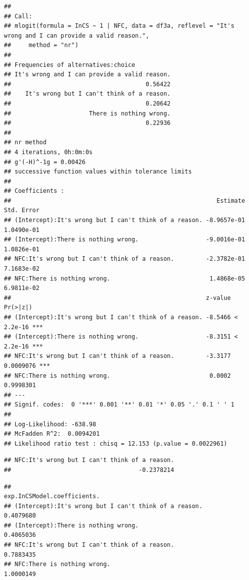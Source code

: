 \documentclass[
  american,
  man,floatsintext]{apa7}
\begin{document}
\begin{verbatim}
## 
## Call:
## mlogit(formula = InCS ~ 1 | NFC, data = df3a, reflevel = "It's wrong and I can provide a valid reason.", 
##     method = "nr")
## 
## Frequencies of alternatives:choice
## It's wrong and I can provide a valid reason. 
##                                      0.56422 
##    It's wrong but I can't think of a reason. 
##                                      0.20642 
##                      There is nothing wrong. 
##                                      0.22936 
## 
## nr method
## 4 iterations, 0h:0m:0s 
## g'(-H)^-1g = 0.00426 
## successive function values within tolerance limits 
## 
## Coefficients :
##                                                          Estimate  Std. Error
## (Intercept):It's wrong but I can't think of a reason. -8.9657e-01  1.0490e-01
## (Intercept):There is nothing wrong.                   -9.0016e-01  1.0826e-01
## NFC:It's wrong but I can't think of a reason.         -2.3782e-01  7.1683e-02
## NFC:There is nothing wrong.                            1.4868e-05  6.9811e-02
##                                                       z-value  Pr(>|z|)    
## (Intercept):It's wrong but I can't think of a reason. -8.5466 < 2.2e-16 ***
## (Intercept):There is nothing wrong.                   -8.3151 < 2.2e-16 ***
## NFC:It's wrong but I can't think of a reason.         -3.3177 0.0009076 ***
## NFC:There is nothing wrong.                            0.0002 0.9998301    
## ---
## Signif. codes:  0 '***' 0.001 '**' 0.01 '*' 0.05 '.' 0.1 ' ' 1
## 
## Log-Likelihood: -638.98
## McFadden R^2:  0.0094201 
## Likelihood ratio test : chisq = 12.153 (p.value = 0.0022961)
\end{verbatim}

\begin{verbatim}
## NFC:It's wrong but I can't think of a reason. 
##                                    -0.2378214
\end{verbatim}

\begin{verbatim}
##                                                       exp.InCSModel.coefficients.
## (Intercept):It's wrong but I can't think of a reason.                   0.4079680
## (Intercept):There is nothing wrong.                                     0.4065036
## NFC:It's wrong but I can't think of a reason.                           0.7883435
## NFC:There is nothing wrong.                                             1.0000149
\end{verbatim}
\end{document}
